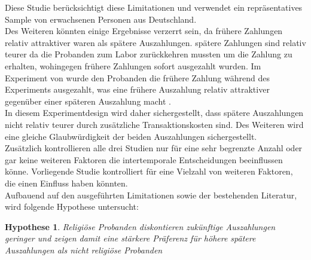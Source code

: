 \documentclass[11pt,a4paper]{article}
\newtheorem{hyp}{Hypothese}
\begin{document}
Diese Studie berücksichtigt diese Limitationen und verwendet ein repräsentatives Sample von erwachsenen Personen aus Deutschland.\\ 

Des Weiteren könnten einige Ergebnisse verzerrt sein, da frühere Zahlungen relativ attraktiver waren als spätere Auszahlungen. \textcite{carter2012religious}  spätere Zahlungen sind relativ teurer da die Probanden zum Labor zurückkehren mussten um die Zahlung zu erhalten, wohingegen frühere Zahlungen sofort ausgezahlt wurden. Im Experiment von \textcite{benjamin2013religious} wurde den Probanden die frühere Zahlung während des Experiments ausgezahlt, was eine frühere Auszahlung relativ attraktiver gegenüber einer späteren Auszahlung macht \parencite{dohmen2012interpreting}.\\

 
In diesem Experimentdesign wird daher sichergestellt, dass spätere Auszahlungen nicht relativ teurer durch zusätzliche Transaktionskosten sind. Des Weiteren wird eine gleiche Glaubwürdigkeit der beiden Auszahlungen sichergestellt.\\

Zusätzlich kontrollieren alle drei Studien nur für eine sehr begrenzte Anzahl oder gar keine weiteren Faktoren die  intertemporale Entscheidungen beeinflussen könne.
Vorliegende Studie kontrolliert für eine Vielzahl von weiteren Faktoren, die einen Einfluss haben könnten.\\ 




Aufbauend auf den ausgeführten Limitationen sowie der bestehenden Literatur, wird folgende Hypothese untersucht:
\begin{hyp}
Religiöse Probanden diskontieren zukünftige Auszahlungen geringer und zeigen damit eine stärkere Präferenz für höhere spätere Auszahlungen als nicht religiöse Probanden 
\end{hyp}
\end{document}
